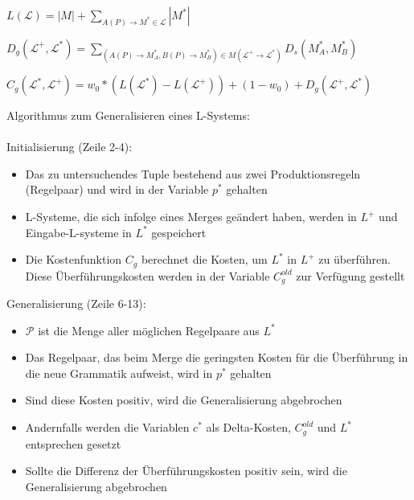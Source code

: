 \begin{algorithm}[caption={Längenfunktion $L$ für Grammatiken}]
    $L(\mathcal{L}) = |M| + \sum\limits_{A(P) \rightarrow M^* \in \mathcal{L}} |M^*|$
\end{algorithm}

\begin{algorithm}[caption={Grammar Edit Distance}]
    $D_g(\mathcal{L}^+, \mathcal{L}^*)= \sum\limits_{(A(P) \rightarrow M^*_A , B(P) \rightarrow M^*_B) \in M(\mathcal{L^+} \rightarrow \mathcal{L^*})} D_s(M^*_A, M^*_B)$
\end{algorithm}

\begin{algorithm}[caption={Kostenfunktion $C_g$ mit Gewichtung $w_0$}]
    $C_g(\mathcal{L}^*, \mathcal{L}^+) = w_0 * (L(\mathcal{L}^*) - L(\mathcal{L}^+)) + (1 - w_0) + D_g(\mathcal{L}^+, \mathcal{L}^*)$
\end{algorithm}

Algorithmus zum Generalisieren eines L-Systems:\\~\\
Initialisierung (Zeile 2-4):
\begin{itemize}
    \item Das zu untersuchendes Tuple bestehend aus zwei Produktionsregeln (Regelpaar) und wird in der Variable $p^*$ gehalten
    \item L-Systeme, die sich infolge eines Merges geändert haben, werden in $L^+$ und Eingabe-L-systeme in $L^*$ gespeichert
    \item Die Kostenfunktion $C_g$ berechnet die Kosten, um $L^*$ in $L^+$ zu überführen. Diese Überführungskosten werden
    in der Variable $C^{old}_g$ zur Verfügung gestellt
\end{itemize}
Generalisierung (Zeile 6-13):
\begin{itemize}
    \item $\mathcal{P}$ ist die Menge aller möglichen Regelpaare aus $L^*$
    \item Das Regelpaar, das beim Merge die geringsten Kosten für die Überführung in die neue Grammatik aufweist, wird in
    $p^*$ gehalten
    \item Sind diese Kosten positiv, wird die Generalisierung abgebrochen
    \item Andernfalls werden die Variablen $c^*$ als Delta-Kosten, $C^{old}_g$ und $L^*$ entsprechen gesetzt
    \item Sollte die Differenz der Überführungskosten positiv sein, wird die Generalisierung abgebrochen
\end{itemize}

